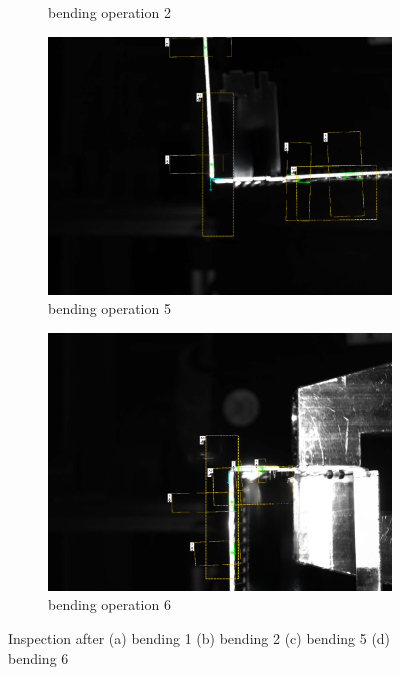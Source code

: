 \begin{figure}[h]
\begin{subfigure}{0.48\textwidth}
        \caption{bending operation 2}
        \label{subfig:inspection-2}
        \vspace{0.5cm}
    \end{subfigure}\hspace{0.25cm}
    \begin{subfigure}{0.48\textwidth}
        \centering
        \includegraphics[width=\textwidth]{figures/008_inspection/inspection_5_overlay_cleanup.png}
        \caption{bending operation 5}
        \label{subfig:inspection-5}
        \vspace{0.25cm}
    \end{subfigure}\hspace{0.25cm}
    \begin{subfigure}{0.48\textwidth}
        \centering
        \includegraphics[width=\textwidth]{figures/008_inspection/inspection_6_overlay_cleanup.png}
        \caption{bending operation 6}
        \label{subfig:inspection-6}
        \vspace{0.25cm}
    \end{subfigure}\hspace{0.25cm}
    \caption{Inspection after (a) bending 1 (b) bending 2 (c) bending 5 (d) bending 6}
    \label{fig:bending-inspection}
\end{figure}
